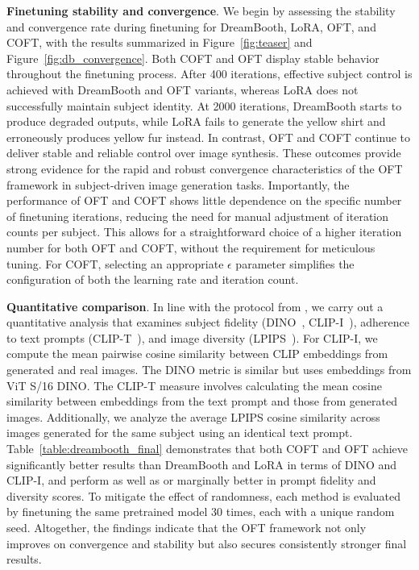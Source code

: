 \textbf{Finetuning stability and convergence}. We begin by assessing the stability and convergence rate during finetuning for DreamBooth, LoRA, OFT, and COFT, with the results summarized in Figure~\ref{fig:teaser} and Figure~\ref{fig:db_convergence}. Both COFT and OFT display stable behavior throughout the finetuning process. After 400 iterations, effective subject control is achieved with DreamBooth and OFT variants, whereas LoRA does not successfully maintain subject identity. At 2000 iterations, DreamBooth starts to produce degraded outputs, while LoRA fails to generate the yellow shirt and erroneously produces yellow fur instead. In contrast, OFT and COFT continue to deliver stable and reliable control over image synthesis. These outcomes provide strong evidence for the rapid and robust convergence characteristics of the OFT framework in subject-driven image generation tasks. Importantly, the performance of OFT and COFT shows little dependence on the specific number of finetuning iterations, reducing the need for manual adjustment of iteration counts per subject. This allows for a straightforward choice of a higher iteration number for both OFT and COFT, without the requirement for meticulous tuning. For COFT, selecting an appropriate $\epsilon$ parameter simplifies the configuration of both the learning rate and iteration count.

\textbf{Quantitative comparison}. In line with the protocol from \cite{ruiz2023dreambooth}, we carry out a quantitative analysis that examines subject fidelity (DINO~\cite{caron2021emerging}, CLIP-I~\cite{radford2021learning}), adherence to text prompts (CLIP-T~\cite{radford2021learning}), and image diversity (LPIPS~\cite{zhang2018unreasonable}). For CLIP-I, we compute the mean pairwise cosine similarity between CLIP embeddings from generated and real images. The DINO metric is similar but uses embeddings from ViT S/16 DINO. The CLIP-T measure involves calculating the mean cosine similarity between embeddings from the text prompt and those from generated images. Additionally, we analyze the average LPIPS cosine similarity across images generated for the same subject using an identical text prompt. Table~\ref{table:dreambooth_final} demonstrates that both COFT and OFT achieve significantly better results than DreamBooth and LoRA in terms of DINO and CLIP-I, and perform as well as or marginally better in prompt fidelity and diversity scores. To mitigate the effect of randomness, each method is evaluated by finetuning the same pretrained model 30 times, each with a unique random seed. Altogether, the findings indicate that the OFT framework not only improves on convergence and stability but also secures consistently stronger final results.

